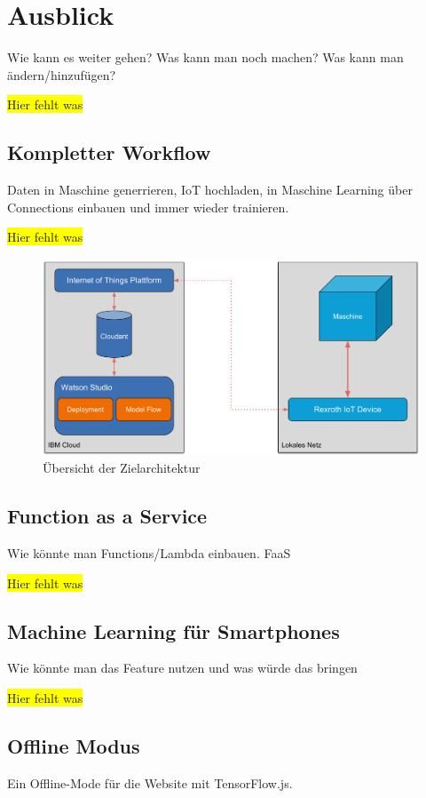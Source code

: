 \chapter{Ausblick}
\label{ch:ausblick}
Wie kann es weiter gehen? Was kann man noch machen? Was kann man ändern/hinzufügen?

\colorbox{yellow}{Hier fehlt was}

\section{Kompletter Workflow}
Daten in Maschine generrieren, IoT hochladen, in Maschine Learning über Connections einbauen und immer wieder
trainieren.

\colorbox{yellow}{Hier fehlt was}

\begin{figure}[h]
    \centering
    \includegraphics[scale=0.5]{images/kapitel_6/architektur_uebersicht.pdf}
    \caption{Übersicht der Zielarchitektur}
    \label{fig:umsetzung_zielarchitektur_5}
\end{figure}

\section{Function as a Service}
Wie könnte man Functions/Lambda einbauen. FaaS

\colorbox{yellow}{Hier fehlt was}

\section{Machine Learning für Smartphones}
Wie könnte man das Feature nutzen und was würde das bringen

\colorbox{yellow}{Hier fehlt was}

\section{Offline Modus}
Ein Offline-Mode für die Website mit TensorFlow.js.

